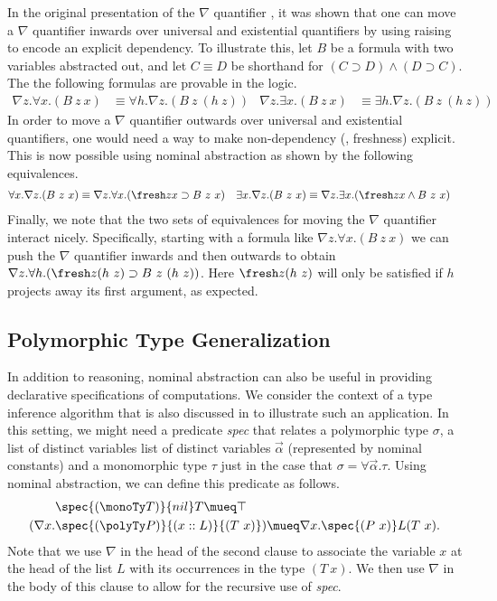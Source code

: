 In the original presentation of the $\nabla$ quantifier
\cite{miller03lics}, it was shown that one can move a $\nabla$
quantifier inwards over universal and existential quantifiers by using
raising to encode an explicit dependency. To illustrate this, let $B$
be a formula with two variables abstracted out, and let $C \equiv D$
be shorthand for $(C \supset D) \land (D\supset C)$. The the following
formulas are provable in the logic.
\begin{align*}
\nabla z. \forall x. (B\ z\ x) &\equiv \forall h. \nabla z.
(B\ z\ (h\ z)) &
\nabla z. \exists x. (B\ z\ x) &\equiv \exists h. \nabla z.
(B\ z\ (h\ z))
\end{align*}
In order to move a $\nabla$ quantifier outwards over universal and
existential quantifiers, one would need a way to make non-dependency
(\ie, freshness) explicit. This is now possible using nominal
abstraction as shown by the following equivalences.
\begin{align*}
\forall x. \nabla z. (B\ z\ x) &\equiv
\nabla z. \forall x. (\fresh z x \supset B\ z\ x)
&
\exists x. \nabla z. (B\ z\ x) &\equiv
\nabla z. \exists x. (\fresh z x \land B\ z\ x)
\end{align*}
Finally, we note that the two sets of equivalences for moving the
$\nabla$ quantifier interact nicely. Specifically, starting with a
formula like $\nabla z. \forall x. (B\ z\ x)$ we can push the $\nabla$
quantifier inwards and then outwards to obtain $\nabla z. \forall h.
(\fresh z (h\ z) \supset B\ z\ (h\ z))$. Here $\fresh z (h\ z)$ will
only be satisfied if $h$ projects away its first argument, as
expected.

\subsection{Polymorphic Type Generalization}

In addition to reasoning, nominal abstraction can also be useful in
providing declarative specifications of computations. We consider the
context of a type inference algorithm that is also discussed in
\cite{cheney08toplas} to illustrate such an application. In this
setting, we might need a predicate {\sl spec} that relates a
polymorphic type $\sigma$, a list of distinct variables
list of distinct variables $\vec{\alpha}$ (represented by nominal
constants) and a monomorphic type $\tau$ just in the case that $\sigma =
\forall\vec{\alpha}.\tau$. Using nominal abstraction, we can define
this predicate as follows.
\begin{align*}
&\spec {(\monoTy T)} {nil} T \mueq \top \\
(\nabla x. &\spec {(\polyTy P)} {(x::L)} {(T\ x)}) \mueq
\nabla x. \spec {(P\ x)} L {(T\ x)}.
\end{align*}
Note that we use $\nabla$ in the head of the second clause to
associate the variable $x$ at the head of the list $L$ with its
occurrences in the type $(T\ x)$. We then use $\nabla$ in the body of
this clause to allow for the recursive use of {\sl spec}.

